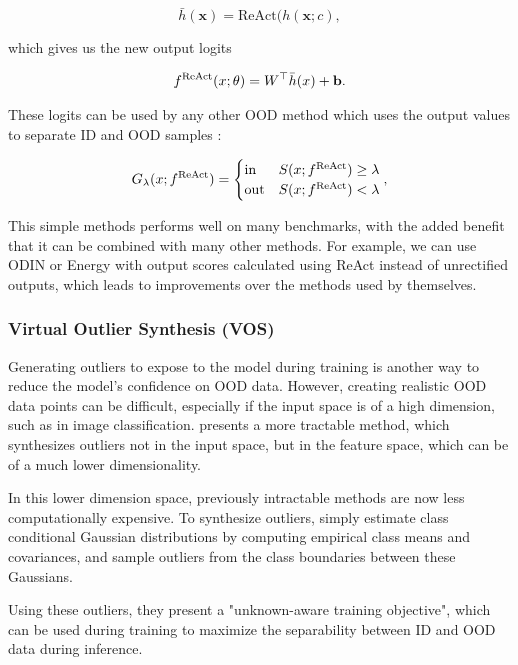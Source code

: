 \documentclass[UKenglish]{uiomasterthesis} %
\theoremstyle{definition}
\begin{document}
\begin{equation}\label{dog}
  \bar{h}(\bm{x}) = \text{ReAct}(h(\bm{x}; c),
\end{equation}

which gives us the new output logits 

\begin{align}
f^{\text{ReAct}}(\*x;\theta) = \*W^\top \bar h(\*x) + \mathbf{b}.
\end{align}

These logits can be used by any other OOD method which uses the output values to separate ID and OOD samples \cite{react}:

\begin{align}
\label{eq:threshold}
	G_{\lambda}(\*x; f^\text{ReAct})=\begin{cases} 
      \text{in } & S(\*x;f^\text{ReAct})\ge \lambda \\
      \text{out} & S(\*x;f^\text{ReAct}) < \lambda 
   \end{cases},
\end{align}

This simple methods performs well on many benchmarks, with the added benefit that it can be combined with many other methods. For example, we can use ODIN or Energy with output scores calculated using ReAct instead of unrectified outputs, which leads to improvements over the methods used by themselves.
\\

\subsubsection{Virtual Outlier Synthesis (VOS)}

Generating outliers to expose to the model during training is another way to reduce the model's confidence on OOD data. However, creating realistic OOD data points can be difficult, especially if the input space is of a high dimension, such as in image classification. \cite{vos} presents a more tractable method, which synthesizes outliers not in the input space, but in the feature space, which can be of a much lower dimensionality.

In this lower dimension space, previously intractable methods are now less computationally expensive. To synthesize outliers, \cite{vos} simply estimate class conditional Gaussian distributions by computing empirical class means and covariances, and sample outliers from the class boundaries between these Gaussians.

Using these outliers, they present a "unknown-aware training objective", which can be used during training to maximize the separability between ID and OOD data during inference.
\\
\end{document}
